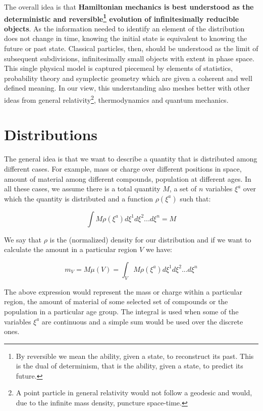 \documentclass[11pt]{article}
\begin{document}
The overall idea is that \textbf{Hamiltonian mechanics is best understood as the deterministic and reversible\footnote{By reversible we mean the ability, given a state, to reconstruct its past. This is the dual of determinism, that is the ability, given a state, to predict its future.} evolution of infinitesimally reducible objects}. As the information needed to identify an element of the distribution does not change in time, knowing the initial state is equivalent to knowing the future or past state. Classical particles, then, should be understood as the limit of subsequent subdivisions, infinitesimally small objects with extent in phase space. This single physical model is captured piecemeal by elements of statistics, probability theory and symplectic geometry which are given a coherent and well defined meaning. In our view, this understanding also meshes better with other ideas from general relativity\footnote{A point particle in general relativity would not follow a geodesic and would, due to the infinite mass density, puncture space-time.}, thermodynamics and quantum mechanics.



\section{Distributions}

The general idea is that we want to describe a quantity that is distributed among different cases. For example, mass or charge over different positions in space, amount of material among different compounds, population at different ages. In all these cases, we assume there is a total quantity $M$, a set of $n$ variables $\xi^a$ over which the quantity is distributed and a function $\rho(\xi^a)$ such that:

\begin{equation}
\int M \rho(\xi^a) d\xi^1 d\xi^2 ... d\xi^n = M
\end{equation}

We say that $\rho$ is the (normalized) density for our distribution and if we want to calculate the amount in a particular region $V$ we have:

\begin{equation}
m_V = M \mu(V) =\int_V M \rho(\xi^a) d\xi^1 d\xi^2 ... d\xi^n
\end{equation}

The above expression would represent the mass or charge within a particular region, the amount of material of some selected set of compounds or the population in a particular age group. The integral is used when some of the variables $\xi^a$ are continuous and a simple sum would be used over the discrete ones.
\end{document}
